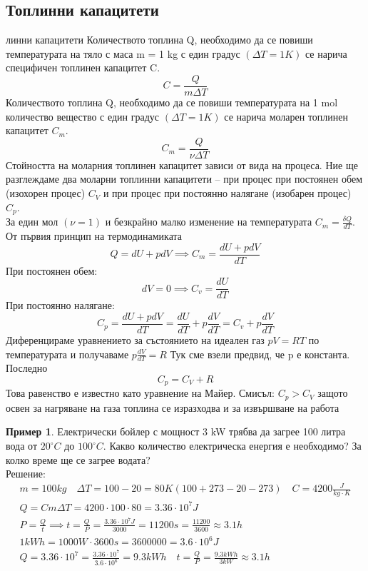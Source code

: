 \documentclass[fleqn, 12pt]{article}
\theoremstyle{definition}
\newtheorem{example}{Пример}[subsection]
\begin{document}
\subsection{Топлинни капацитети}
линни капацитети
Количеството топлина Q, необходимо да се повиши температурата на тяло с маса m = 1 kg с един градус 
$(\Delta T = 1K)$ се нарича специфичен топлинен капацитет C.
$$C = \frac{Q}{m\Delta T}$$
Количеството топлина Q, необходимо да се повиши температурата на 1 mol количество вещество с един градус 
$(\Delta T = 1K)$ се нарича моларен топлинен капацитет $C_m$.
$$C_m = \frac{Q}{\nu \Delta T}$$
Стойността на моларния топлинен капацитет зависи от вида на процеса. Ние ще
разглеждаме два моларни топлинни капацитети – при процес при постоянен обем (изохорен процес)
$C_V$ и при процес при постоянно налягане (изобарен процес) $C_p$. \\
За един мол $( \nu = 1)$ и безкрайно малко изменение на температурата $C_m = \frac{\delta Q}{ dT}$. 
От първия принцип на термодинамиката $$Q = dU + pdV \implies C_m = \frac{dU + pdV}{dT}$$ 
При постоянен обем: 
$$dV= 0 \implies C_v = \frac{dU}{dT}$$
При постоянно налягане: 
$$C_p = \frac{dU + pdV}{dT} = \frac{dU}{dT} + p\frac{dV}{dT} = C_v + p\frac{dV}{dT}$$
Диференцираме уравнението за състоянието на идеален газ $pV = RT$ по температурата и получаваме $p\frac{dV}{dT} = R$ Тук сме взели предвид, че p е константа. Последно
$$C_p = C_V + R$$
Това равенство е известно като уравнение на Майер. Смисъл: $C_p > C_V$
защото освен за нагряване на газа топлина се изразходва и за извършване на работа
\begin{example}
Електрически бойлер с мощност 3 kW трябва да загрее 100 литра вода от
$20^\circ C$ до $100^\circ C$. Какво количество електрическа енергия е необходимо? За колко
време ще се загрее водата? \\
Решение: \\
\begin{gather*}
m = 100kg \quad \Delta T = 100 - 20 = 80K (100+273 - 20 - 273) \quad C = 4200 \frac{J}{kg \cdot K} \\
Q = Cm\Delta T = 4200 \cdot 100 \cdot 80 = 3.36 \cdot 10^7 J \\
P = \frac{Q}{t} \implies t = \frac{Q}{P} = \frac{3.36 \cdot 10^7 J}{3000} = 11200s = \frac{11200}{3600} \approx 3.1 h \\
1kWh = 1000W \cdot 3600s = 3 600 000 = 3.6 \cdot 10^6J \\
Q = 3.36 \cdot 10^7 = \frac{3.36 \cdot 10^7}{3.6 \cdot 10^6} = 9.3kWh \quad t = \frac{Q}{P} = \frac{9.3kWh}{3kW} 
\approx 3.1 h
\end{gather*}
\end{example}
\end{document}
